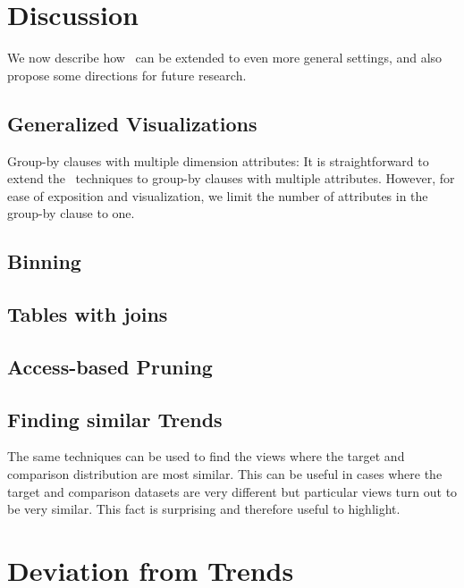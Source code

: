 

\section{Discussion}
\label{sec:discussion}
We now describe how \VizRecDB\ can be extended to even more general settings,
and also propose some directions for future research.

\subsection{Generalized Visualizations}\label{sec:discussion:multi-col}

Group-by clauses with multiple dimension attributes: It is
straightforward to extend the \VizRecDB\ techniques  to group-by clauses with multiple attributes.
However, for ease of exposition and visualization, we limit the number of
attributes in the group-by clause to one.

\subsection{Binning}

\subsection{Tables with joins}

\subsection{Access-based Pruning}

\subsection{Finding similar Trends}
The same techniques can be used to find the views where the target and
comparison distribution are most similar. 
This can be useful in cases where the target and comparison datasets are very
different but particular views turn out to be very similar.
This fact is surprising and therefore useful to highlight.

\section{Deviation from Trends}

